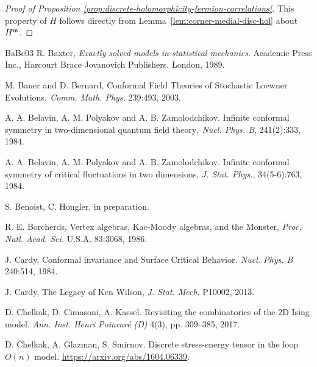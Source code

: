 \documentclass[12pt,oneside,english]{amsart}
\numberwithin{equation}{section}
\numberwithin{figure}{section}
\theoremstyle{plain}
\theoremstyle{plain}
\theoremstyle{plain}
\theoremstyle{plain}
\theoremstyle{remark}
\theoremstyle{definition}
\theoremstyle{plain}
\theoremstyle{plain}
\numberwithin{thm}{section}
\begin{document}
\begin{proof}[Proof of Proposition 
\ref{prop:discrete-holomorphicity-fermion-correlations}]
This property of $H$ follows directly from 
Lemma~\ref{lem:corner-medial-disc-hol} about $H^{\mathfrak{m}}$.
\end{proof}
\begin{thebibliography}{BaBe03}
R. Baxter, \emph{Exactly solved models in
statistical mechanics}. Academic Press Inc., Harcourt Brace Jovanovich
Publishers, London, 1989.

M. Bauer and D. Bernard, Conformal
Field Theories of Stochastic Loewner Evolutions\emph{. Comm. Math.
Phys.} 239:493, 2003.

A. A. Belavin,
A. M. Polyakov and A. B. Zamolodchikov. Infinite conformal symmetry
in two-dimensional quantum field theory\emph{, Nucl. Phys. B}, 
241(2):333,
1984.

A. A. Belavin,
A. M. Polyakov and A. B. Zamolodchikov. Infinite conformal symmetry
of critical fluctuations in two dimensions,\emph{ J. Stat. Phys.},
34(5-6):763, 1984.

S. Benoist, C. Hongler, in preparation.

R. E. Borcherds, Vertex algebras, Kac-Moody
algebras, and the Monster, \emph{Proc. Natl. Acad. Sci.} U.S.A. 
83:3068,
1986.

J. Cardy, Conformal invariance and Surface
Critical Behavior\emph{. Nucl. Phys. B} 240:514, 1984.

J. Cardy, The Legacy of Ken Wilson, \emph{J.
Stat. Mech}. P10002, 2013.

D. Chelkak, D. Cimasoni, A. Kassel.
Revisiting the combinatorics of the 2D Ising model.
\emph{Ann. Inst. Henri Poincar\'e (D)} 4(3), pp. 309--385, 2017.

D. Chelkak, A. Glazman, S.
Smirnov.
Discrete stress-energy tensor in the loop $O(n)$ model.
\url{https://arxiv.org/abs/1604.06339}.


\end{thebibliography}
\end{document}
